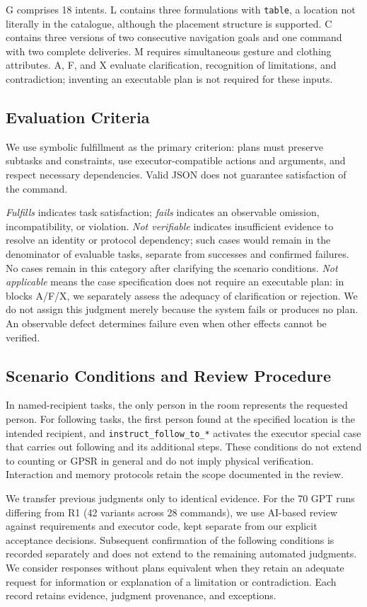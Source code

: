 \documentclass[a4paper,twoside]{article}
\begin{document}
G comprises 18 intents. L contains three formulations with \texttt{table}, a location not literally in the catalogue, although the placement structure is supported. C contains three versions of two consecutive navigation goals and one command with two complete deliveries. M requires simultaneous gesture and clothing attributes. A, F, and X evaluate clarification, recognition of limitations, and contradiction; inventing an executable plan is not required for these inputs.

\subsection{Evaluation Criteria}
We use symbolic fulfillment as the primary criterion: plans must preserve subtasks and constraints, use executor-compatible actions and arguments, and respect necessary dependencies. Valid JSON does not guarantee satisfaction of the command.

\emph{Fulfills} indicates task satisfaction; \emph{fails} indicates an observable omission, incompatibility, or violation. \emph{Not verifiable} indicates insufficient evidence to resolve an identity or protocol dependency; such cases would remain in the denominator of evaluable tasks, separate from successes and confirmed failures. No cases remain in this category after clarifying the scenario conditions. \emph{Not applicable} means the case specification does not require an executable plan: in blocks A/F/X, we separately assess the adequacy of clarification or rejection. We do not assign this judgment merely because the system fails or produces no plan. An observable defect determines failure even when other effects cannot be verified.

\subsection{Scenario Conditions and Review Procedure}
In named-recipient tasks, the only person in the room represents the requested person. For following tasks, the first person found at the specified location is the intended recipient, and \texttt{instruct\_follow\_to\_*} activates the executor special case that carries out following and its additional steps. These conditions do not extend to counting or GPSR in general and do not imply physical verification. Interaction and memory protocols retain the scope documented in the review.

We transfer previous judgments only to identical evidence. For the 70 GPT runs differing from R1 (42 variants across 28 commands), we use AI-based review against requirements and executor code, kept separate from our explicit acceptance decisions. Subsequent confirmation of the following conditions is recorded separately and does not extend to the remaining automated judgments. We consider responses without plans equivalent when they retain an adequate request for information or explanation of a limitation or contradiction. Each record retains evidence, judgment provenance, and exceptions.
\end{document}

